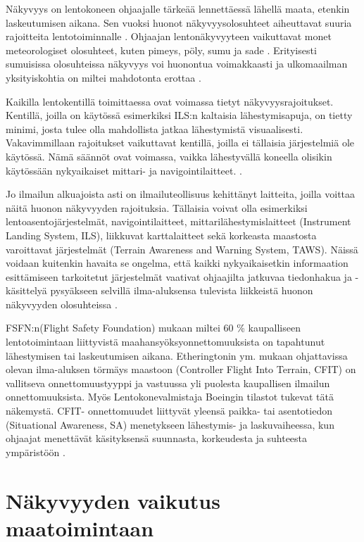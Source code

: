\documentclass[utf8,bachelor,manualbib]{gradu3}
\begin{document}
Näkyvyys on lentokoneen ohjaajalle tärkeää lennettäessä lähellä maata, etenkin laskeutumisen aikana. Sen vuoksi huonot näkyvyysolosuhteet aiheuttavat suuria rajoitteita lentotoiminnalle \citep{mollersachs1994}. Ohjaajan lentonäkyvyyteen vaikuttavat monet meteorologiset olosuhteet, kuten pimeys, pöly, sumu ja sade \citep{wickens2009}. Erityisesti sumuisissa olosuhteissa näkyvyys voi huonontua voimakkaasti ja ulkomaailman yksityiskohtia on miltei mahdotonta erottaa \citep{beiergemperlein2004}.

Kaikilla lentokentillä toimittaessa ovat voimassa tietyt näkyvyysrajoitukset. Kentillä, joilla on käytössä esimerkiksi ILS:n kaltaisia lähestymisapuja, on tietty minimi, josta tulee olla mahdollista jatkaa lähestymistä visuaalisesti. Vakavimmillaan rajoitukset vaikuttavat kentillä, joilla ei tällaisia järjestelmiä ole käytössä. Nämä säännöt ovat voimassa, vaikka lähestyvällä koneella olisikin käytössään nykyaikaiset mittari- ja navigointilaitteet. \cite{mollersachs1994}.

Jo ilmailun alkuajoista asti on ilmailuteollisuus kehittänyt laitteita, joilla voittaa näitä huonon näkyvyyden rajoituksia. Tällaisia voivat olla esimerkiksi lentoasentojärjestelmät, navigointilaitteet, mittarilähestymislaitteet (Instrument Landing System, ILS), liikkuvat karttalaitteet sekä korkeasta maastosta varoittavat järjestelmät (Terrain Awareness and Warning System, TAWS). Näissä voidaan kuitenkin havaita se ongelma, että kaikki nykyaikaisetkin informaation esittämiseen tarkoitetut järjestelmät vaativat ohjaajilta jatkuvaa tiedonhakua ja -käsittelyä pysyäkseen selvillä ilma-aluksensa tulevista liikkeistä huonon näkyvyyden olosuhteissa \citep {prinzel2004}.

FSFN:n(Flight Safety Foundation) mukaan miltei 60 \% kaupalliseen lentotoimintaan liittyvistä maahansyöksyonnettomuuksista on tapahtunut lähestymisen tai laskeutumisen aikana. Etheringtonin ym. \citeyearpar{etherington2000} mukaan ohjattavissa olevan ilma-aluksen törmäys maastoon (Controller Flight Into Terrain, CFIT) on vallitseva onnettomuustyyppi ja vastuussa yli puolesta kaupallisen ilmailun onnettomuuksista. Myös Lentokonevalmistaja Boeingin \citeyearpar{boeing1996} tilastot tukevat tätä näkemystä. CFIT- onnettomuudet liittyvät yleensä paikka- tai asentotiedon (Situational Awareness, SA) menetykseen lähestymis- ja laskuvaiheessa, kun ohjaajat menettävät käsityksensä suunnasta, korkeudesta ja suhteesta ympäristöön \cite{schnellym2004}.

\section{Näkyvyyden vaikutus maatoimintaan}
\end{document}
